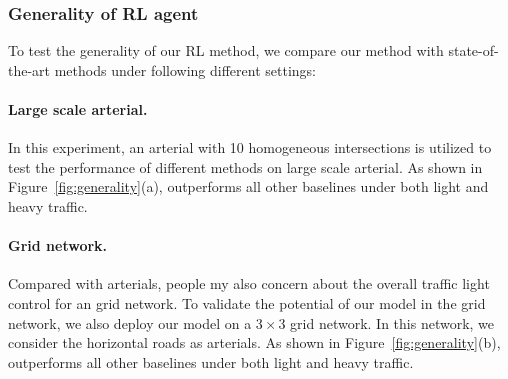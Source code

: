 


\subsubsection{Generality of RL agent}
To test the generality of our RL method, we compare our method \MTDeeplight with state-of-the-art methods under following different settings:

\paragraph{Large scale arterial.} In this experiment, an arterial with 10 homogeneous intersections is utilized to test the performance of different methods on large scale arterial. As shown in Figure~\ref{fig:generality}(a), \MTDeeplight outperforms all other baselines under both light and heavy traffic.

\paragraph{Grid network.} Compared with arterials, people my also concern about the overall traffic light control for an grid network. To validate the potential of our model in the grid network, we also deploy our model on a $3\times3$ grid network. In this network, we consider the horizontal roads as arterials.
As shown in Figure~\ref{fig:generality}(b), \MTDeeplight outperforms all other baselines under both light and heavy traffic. 

